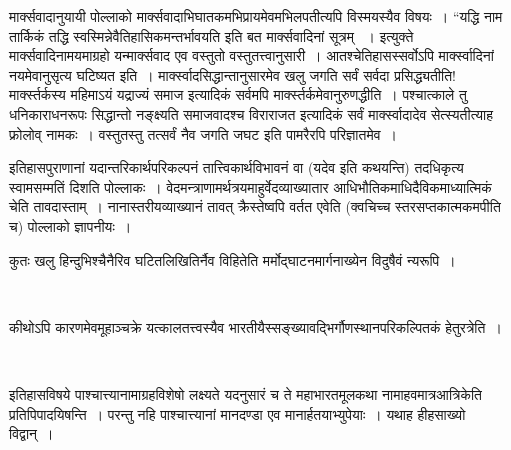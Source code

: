 मार्क्सवादानुयायी पोल्लाको मार्क्सवादाभिघातकमभिप्रायमेवमभिलपतीत्यपि विस्मयस्यैव विषयः~। “यद्धि नाम तार्किकं तद्धि स्वस्मिन्नेवैतिहासिकमन्तर्भावयति  इति बत मार्क्सवादिनां सूत्रम् ~। इत्युक्ते मार्क्सवादिनामयमाग्रहो यन्मार्क्सवाद एव वस्तुतो वस्तुतत्त्वानुसारी~। आतश्चेतिहासस्सर्वोऽपि मार्क्स्वादिनां नयमेवानुसृत्य घटिष्यत इति~। मार्क्स्वादसिद्धान्तानुसारमेव खलु जगति सर्वं सर्वदा प्रसिद्ध्यतीति! मार्क्स्तर्कस्य महिमाऽयं यद्राज्यं समाज इत्यादिकं सर्वमपि मार्क्स्तर्कमेवानुरुणद्धीति~। पश्चात्काले तु धनिकाराधनरूपः  सिद्धान्तो नङ्क्ष्यति समाजवादश्च विराराजत इत्यादिकं सर्वं मार्क्स्वादादेव सेत्स्यतीत्याह फ्रोलोव्  नामकः~। वस्तुतस्तु तत्सर्वं नैव जगति जघट इति पामरैरपि परिज्ञातमेव~।

इतिहासपुराणानां यदान्तरिकार्थपरिकल्पनं तात्त्विकार्थविभावनं वा (यदेव  इति कथयन्ति) तदधिकृत्य स्वामसम्मतिं दिशति पोल्लाकः~। वेदमन्त्राणामर्थत्रयमाहुर्वेदव्याख्यातार आधिभौतिकमाधिदैविकमाध्यात्मिकं चेति तावदास्ताम्~। नानास्तरीयव्याख्यानं तावत् क्रैस्तेष्वपि वर्तत एवेति (क्वचिच्च स्तरसप्तकात्मकमपीति च) पोल्लाको ज्ञापनीयः~।

कुतः खलु हिन्दुभिश्चैनैरिव घटितलिखितिर्नैव विहितेति मर्मोद्घाटनमार्गनाख्येन विदुषैवं न्यरूपि~।

\begin{myquote}

~\hfill {}
\end{myquote}

कीथोऽपि कारणमेवमूहाञ्चक्रे यत्कालतत्त्वस्यैव भारतीयैस्सङ्ख्यावद्भिर्गौणस्थानपरिकल्पितकं हेतुरत्रेति~।

\begin{myquote}

~\hfill {}
\end{myquote}

\newpage

इतिहासविषये पाश्चात्त्यानामाग्रहविशेषो लक्ष्यते यदनुसारं च ते महाभारतमूलकथा नामाहवमात्रआत्रिकेति प्रतिपिपादयिषन्ति~। परन्तु नहि पाश्चात्त्यानां मानदण्डा एव मानार्हतयाभ्युपेयाः~। यथाह हीहसाख्यो विद्वान्~।

